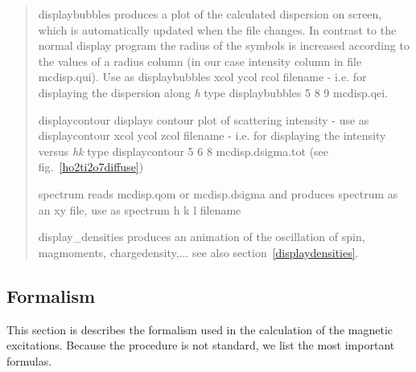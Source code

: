 \begin{quote}
\item [\prg displaybubbles\index{displaybubbles} ] produces a plot of the calculated dispersion on screen, which is 
                       automatically updated when the file changes. In contrast to the normal
		       display program the radius of the symbols is increased according to
		       the values of a radius column (in our case intensity column in file
		       mcdisp.qui). Use as {\prg displaybubbles 
		       xcol ycol rcol filename} - i.e. for displaying the dispersion along
		       {\em h} type {\prg displaybubbles  5 8 9 mcdisp.qei}. 
\item [\prg displaycontour\index{displaycontour}] displays contour plot of scattering intensity - use as
                       {\prg displaycontour xcol ycol zcol filename} - i.e. for displaying
		       the intensity versus {\em hk} type {\prg displaycontour 5 6 8 mcdisp.dsigma.tot}
		       (see fig.~\ref{ho2ti2o7diffuse})
\item [\prg spectrum]  reads mcdisp.qom or mcdisp.dsigma and produces spectrum
                       as an xy file, use as {\prg spectrum h k l filename}
\item [\prg display\_densities\index{display\_densities}] produces an animation of the 
                       oscillation of spin, magmoments, chargedensity,... see also
                       section~\ref{displaydensities}.
\end{quote}

\subsection{Formalism}
\label{formalism}

This section is describes the formalism used in the calculation of the magnetic excitations. Because the
procedure is not standard, we list the most important formulas.

